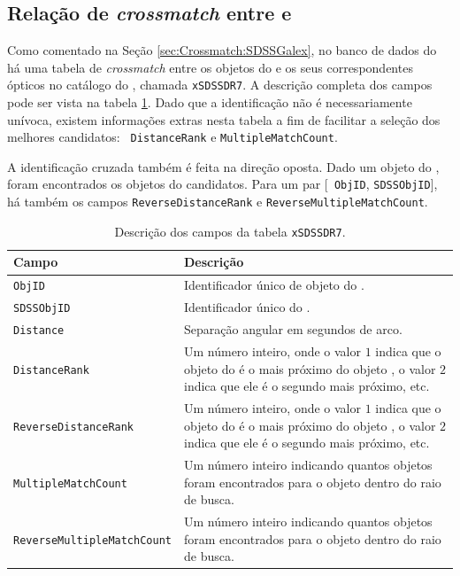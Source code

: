 \subsection{Relação de {\em crossmatch} entre \SDSS e \galex}
\label{sec:Crossmatch:DefAmostras:IdSDSSGalex}

Como comentado na Seção \ref{sec:Crossmatch:SDSSGalex}, no banco de dados do
\galex há uma tabela de {\em crossmatch} entre os objetos do \galex e os seus
correspondentes ópticos no catálogo do \SDSS, chamada \texttt{xSDSSDR7}. A
descrição completa dos campos pode ser vista na tabela \ref{tab:CamposXSDSSDR7}.
Dado que a identificação não é necessariamente unívoca, existem informações
extras nesta tabela a fim de facilitar a seleção dos melhores candidatos: {\tt
DistanceRank} e \texttt{MultipleMatchCount}.

A identificação cruzada também é feita na direção oposta. Dado um objeto do
\SDSS, foram encontrados os objetos do \galex candidatos. Para um par [{\tt
ObjID}, \texttt{SDSSObjID}], há também os campos \texttt{ReverseDistanceRank} e
{\tt ReverseMultipleMatchCount}.

\begin{table}
	\caption[Descrição dos campos da tabela \texttt{xSDSSDR7}.]
	{Descrição dos campos da tabela \texttt{xSDSSDR7}.}
	\begin{tabular}{l p{8cm}}
		Campo & Descrição\\
		\midrule
		\texttt{ObjID} &
		Identificador único de objeto do \galex.
		\\
		\texttt{SDSSObjID} &
		Identificador único do \SDSS.
		\\
		\texttt{Distance} &
		Separação angular em segundos de arco.
		\\
		\texttt{DistanceRank} &
		Um número inteiro, onde o valor $1$ indica que o objeto do \galex é o
		mais próximo do objeto \SDSS, o valor $2$ indica que ele é o segundo mais
		próximo, etc.
		\\
		\texttt{ReverseDistanceRank} &
		Um número inteiro, onde o valor $1$ indica que o objeto do \SDSS é o mais
		próximo do objeto \galex, o valor $2$ indica que ele é o segundo mais
		próximo, etc.
		\\
		\texttt{MultipleMatchCount} &
		Um número inteiro indicando quantos objetos \SDSS foram encontrados para o
		objeto \galex dentro do raio de busca.
		\\
		\texttt{ReverseMultipleMatchCount} &
		Um número inteiro indicando quantos objetos \galex foram encontrados para o
		objeto \SDSS dentro do raio de busca.
		\\
	\end{tabular}
	\label{tab:CamposXSDSSDR7}
\end{table}

